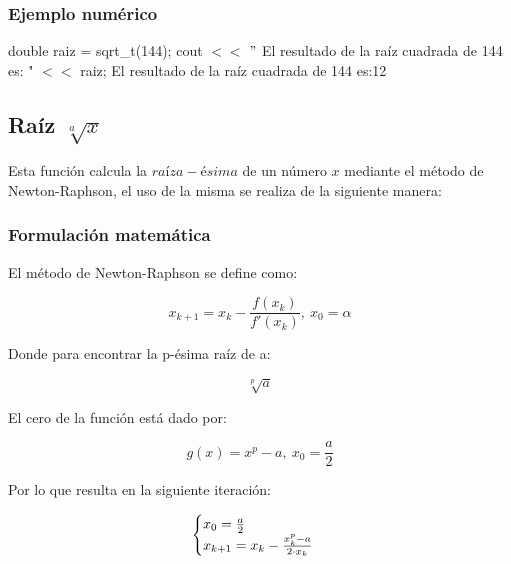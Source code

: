 \documentclass[10pt,a4paper]{article}
\begin{document}
	\subsubsection{Ejemplo numérico}
	double raiz = sqrt{\_}t(144); \newline
	cout $<<$ $"$ El resultado de la raíz cuadrada de 144 es: " $<<$ raiz; \newline
	El resultado de la raíz cuadrada de 144 es:12\newline
	
	
	\subsection{Raíz $\sqrt[a]{x}$}
	
	Esta función calcula la $raíz a-ésima$ de un número $x$ mediante el método de Newton-Raphson, el uso de la misma se realiza de la siguiente manera:
	
	\begin{center}
	\end{center}
	
	\subsubsection{Formulación matemática}

	El método de Newton-Raphson se define como:
	
	\begin{equation}\label{key23}
		x_{k+1} = x_{k} - \frac{f(x_{k})}{f'(x_{k})}, ~x_{0} = \alpha
	\end{equation}
	
	Donde para encontrar la p-ésima raíz de a:
	
	\begin{equation}\label{key24}
		\sqrt[p]{a}	
	\end{equation}

	El cero de la función está dado por:
	
	\begin{equation}\label{key25}
		g(x) = x^{p} - a, ~x_{0} = \frac{a}{2}
	\end{equation}

	Por lo que resulta en la siguiente iteración:
	
	\begin{align*}
		\centering
		\begin{cases}
			x_{0} = \frac{a}{2} \\
			x_{k+1} = x_{k} - \frac{x_{k}^{p} - a}{2\cdot x_{k}}
		\end{cases}
	\end{align*}
	
\end{document}
